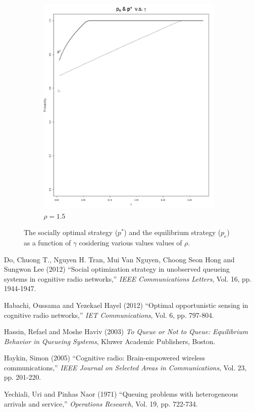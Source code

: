 \documentclass[11pt]{article}
\numberwithin{equation}{section}
\begin{document}
\begin{figure}[h!]
\begin{subfigure}[b]{0.49\textwidth}
	\includegraphics[width=\textwidth]{plots/pe_vs_pstar_rev_1_5.png}
		\caption{$\rho=1.5$}
	\end{subfigure}
	\caption{The socially optimal strategy ($p^*$) and the equilibrium strategy ($p_e$) as a function of $\gamma$ cosidering various values values of $\rho$.}\label{p_e and p*}
\end{figure}

\newpage
\begin{thebibliography}{99}

 Do, Chuong T., Nguyen H. Tran, Mui Van Nguyen, Choong Seon Hong and Sungwon Lee (2012) ``Social optimization strategy in unobserved queueing systems in cognitive radio networks,'' {\it IEEE Communications Letters}, Vol. 16,  pp. 1944-1947.

 Habachi, Oussama and Yezekael Hayel (2012) ``Optimal opportunistic sensing in cognitive radio networks,'' {\it IET Communications}, Vol. 6, pp. 797-804. 

 Hassin, Refael and Moshe Haviv (2003) {\it To Queue or Not to Queue: Equilibrium Behavior in Queueing Systems}, Kluwer Academic Publishers, Boston.

 Haykin, Simon (2005) ``Cognitive radio: Brain-empowered wireless communications,'' {\it IEEE Journal on Selected Areas in Communications}, Vol. 23, pp. 201-220.

 Yechiali, Uri and Pinhas Naor (1971) ``Queuing problems with heterogeneous arrivals and service,'' {\it Operations Research}, Vol. 19, pp. 722-734.

\end{thebibliography}
\end{document}
